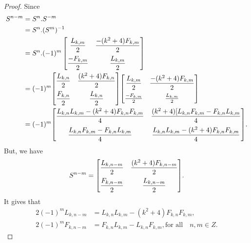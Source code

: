 \begin{proof}
Since
\begin{align*}
S^{n-m}&=S^n.S^{-m}\\
			 &=S^n.(S^{m})^{-1}\\
			 &=S^n.(-1)^m
 \begin{bmatrix}{}
    \dfrac{L_{k,m}}{2} & \dfrac{-(k^2+4)F_{k,m}}{2} \vspace{.2cm}\\
    \dfrac{-F_{k,m}}{2} & \dfrac{L_{k,m}}{2} \\
	\end{bmatrix}
	\\
	&=(-1)^m{
 \begin{bmatrix}{}
    \dfrac{L_{k,n}}{2} & \dfrac{(k^2+4)F_{k,n}}{2} \vspace{.2cm}\\
    \dfrac{F_{k,n}}{2} & \dfrac{L_{k,n}}{2} \\
	\end{bmatrix}
	}{
 \begin{bmatrix}{}
    \dfrac{L_{k,m}}{2} & \dfrac{-(k^2+4)F_{k,m}}{2}\vspace{.2cm} \\
    \frac{-F_{k,m}}{2} & \frac{L_{k,m}}{2} \\
	\end{bmatrix}
	}\\								
	&=(-1)^m{
 \begin{bmatrix}{}
    \dfrac{L_{k,n}L_{k,m}-(k^2+4)F_{k,n}F_{k,m}}{4} & \dfrac{(k^2+4)[L_{k,n}F_{k,m}-F_{k,n}L_{k,m}}{4}\vspace{.2cm} \\
    \dfrac{L_{k,n}F_{k,m}-F_{k,n}L_{k,m}}{4} & \dfrac{L_{k,n}L_{k,m}-(k^2+4)F_{k,n}F_{k,m}}{4} \\
	\end{bmatrix}
	}.
\end{align*}		
But, we have
$$S^{n-m}={
 \begin{bmatrix}{}
    \dfrac{L_{k,n-m}}{2} & \dfrac{(k^2+4)F_{k,n-m}}{2}\vspace{.2cm} \\
    \dfrac{F_{k,n-m}}{2} & \dfrac{L_{k,n-m}}{2} \\
	\end{bmatrix}
	}.$$
	It gives that
	\begin{align*}
	2(-1)^mL_{k,n-m}&=L_{k,n}L_{k,m}-(k^2+4)F_{k,n}F_{k,m},\\
2(-1)^mF_{k,n-m}&=F_{k,n}L_{k,m}-L_{k,n}F_{k,m}, \text{for all}\quad n,m\in Z.
	\end{align*}
\end{proof}
